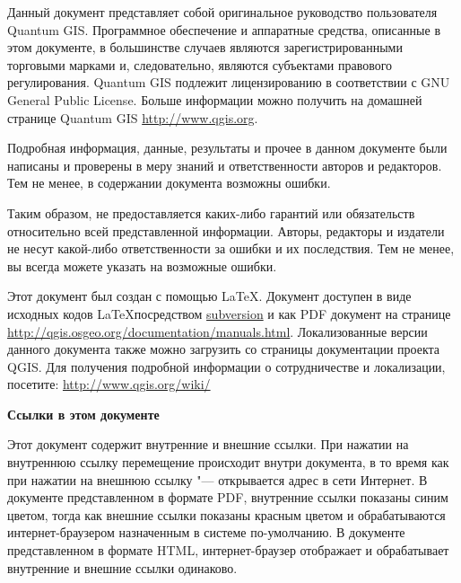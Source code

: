 \frontmatter
\pagestyle{scrplain}
\vspace{1cm}


Данный документ представляет собой оригинальное руководство пользователя
Quantum GIS. Программное обеспечение и аппаратные средства, описанные в
этом документе, в большинстве случаев являются зарегистрированными
торговыми марками и, следовательно, являются субъектами правового
регулирования. Quantum GIS подлежит лицензированию в соответствии с GNU
General Public License. Больше информации можно получить на домашней
странице Quantum GIS \url{http://www.qgis.org}.
\par\bigskip
Подробная информация, данные, результаты и прочее в данном документе
были написаны и проверены в меру знаний и ответственности авторов и
редакторов. Тем не менее, в содержании документа возможны ошибки.
\par\bigskip
Таким образом, не предоставляется каких-либо гарантий или обязательств
относительно всей представленной информации. Авторы, редакторы и
издатели не несут какой-либо ответственности за ошибки и их последствия.
Тем не менее, вы всегда можете указать на возможные ошибки.
\par\bigskip
Этот документ был создан с помощью \LaTeX. Документ доступен в виде
исходных кодов \LaTeX посредством
\href{http://wiki.qgis.org/qgiswiki/DocumentationWritersCorner}{subversion}
и как PDF документ на странице
\url{http://qgis.osgeo.org/documentation/manuals.html}.
Локализованные версии данного документа также можно загрузить со
страницы документации проекта QGIS. Для получения подробной информации
о сотрудничестве и локализации, посетите: \url{http://www.qgis.org/wiki/}

\vspace{1cm}
\noindent
\textbf{Ссылки в этом документе}
\par\bigskip
Этот документ содержит внутренние и внешние ссылки. При нажатии на
внутреннюю ссылку перемещение происходит внутри документа, в то время
как при нажатии на внешнюю ссылку "--- открывается адрес в сети Интернет.
В документе представленном в формате PDF, внутренние ссылки показаны
синим цветом, тогда как внешние ссылки показаны красным цветом и
обрабатываются интернет-браузером назначенным в системе по-умолчанию. В
документе представленном в формате HTML, интернет-браузер отображает и
обрабатывает внутренние и внешние ссылки одинаково.

